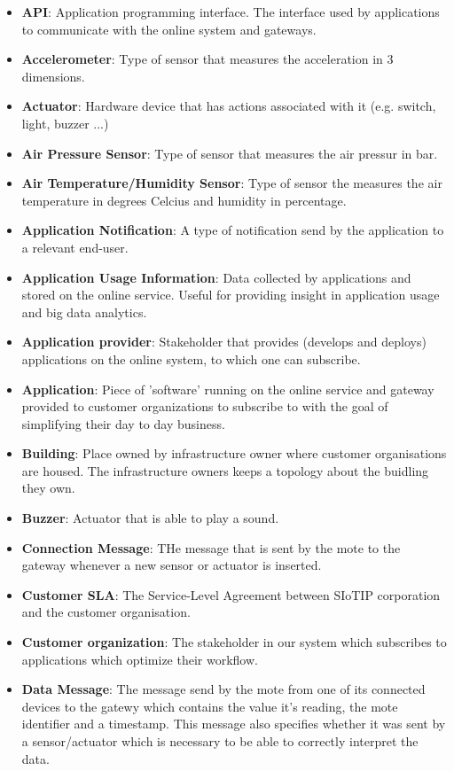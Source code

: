 \documentclass[english,peerreview]{sareport}
\begin{document}
\begin{itemize}
	\item \textbf{API}: Application programming interface. The interface used by applications to communicate with the online system and gateways.
	\item \textbf{Accelerometer}: Type of sensor that measures the acceleration in 3 dimensions.
	\item \textbf{Actuator}: Hardware device that has actions associated with it (e.g. switch, light, buzzer ...)
	\item \textbf{Air Pressure Sensor}: Type of sensor that measures the air pressur in bar.
	\item \textbf{Air Temperature/Humidity Sensor}: Type of sensor the measures the air temperature in degrees Celcius and humidity in percentage.
	\item \textbf{Application Notification}: A type of notification send by the application to a relevant end-user.
	\item \textbf{Application Usage Information}: Data collected by applications and stored on the online service. Useful for providing insight in application usage and big data analytics.
	\item \textbf{Application provider}: Stakeholder that provides (develops and deploys) applications on the online system, to which one can subscribe.
	\item \textbf{Application}: Piece of 'software' running on the online service and gateway provided to customer organizations to subscribe to with the goal of simplifying their day to day business.
	\item \textbf{Building}: Place owned by infrastructure owner where customer organisations are housed. The infrastructure owners keeps a topology about the buidling they own.
	\item \textbf{Buzzer}: Actuator that is able to play a sound.
	\item \textbf{Connection Message}: THe message that is sent by the mote to the gateway whenever a new sensor or actuator is inserted.
	\item \textbf{Customer SLA}: The Service-Level Agreement between SIoTIP corporation and the customer organisation.
	\item \textbf{Customer organization}: The stakeholder in our system which subscribes to applications which optimize their workflow.
	\item \textbf{Data Message}: The message send by the mote from one of its connected devices to the gatewy which contains the value it's reading, the mote identifier and a timestamp. This message also specifies whether it was sent by a sensor/actuator which is necessary to be able to correctly interpret the data.

\end{itemize}
\end{document}
